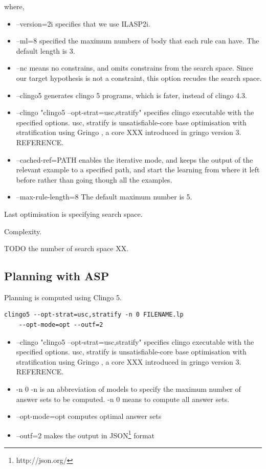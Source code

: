 where,
\begin{itemize}
\item \textsf{--version=2i} specifies that we use ILASP2i.
\item \textsf{--ml=8} specified the maximum numbers of body that each rule can have. The default length is 3.
\item \textsf{--nc} means no constrains, and omits constrains from the search space. Since our target hypothesis is not a constraint, this option recudes the search space.
\item \textsf{--clingo5} generates clingo 5 programs, which is fater, instead of clingo 4.3.
\item \textsf{--clingo "clingo5 --opt-strat=usc,stratify"} specifies clingo executable with the specified options. 
\textsf{usc, stratify} is unsatisfiable-core base optimisation with stratification using Gringo \cite{gringo}, a core XXX introduced in gringo version 3. REFERENCE.
\item \textsf{--cached-ref=PATH} enables the iterative mode, and keeps the output of the relevant example to a specified path, and start the learning from where it left before rather than going though all the examples.
\item \textsf{--max-rule-length=8} The default maximum number is 5.
\end{itemize}

Last optimisation is specifying search space.

Complexity. 

TODO the number of search space XX. 

\subsection{Planning with ASP}
Planning is computed using Clingo 5.

\begin{lstlisting}[]
    clingo5 --opt-strat=usc,stratify -n 0 FILENAME.lp
    --opt-mode=opt --outf=2
\end{lstlisting}

\begin{itemize}
\item \textsf{--clingo "clingo5 --opt-strat=usc,stratify"} specifies clingo executable with the specified options. 
\textsf{usc, stratify} is unsatisfiable-core base optimisation with stratification using Gringo \cite{gringo}, a core XXX introduced in gringo version 3. REFERENCE.
\item \textsf{-n 0} -n is an abbreviation of \textsf{models} to specify the maximum number of answer sets to be computed. \textsf{-n 0} means to compute all answer sets.
\item \textsf{--opt-mode=opt} computes optimal answer sets
\item \textsf{--outf=2} makes the output in JSON\footnote{http://json.org/} format
\end{itemize}

